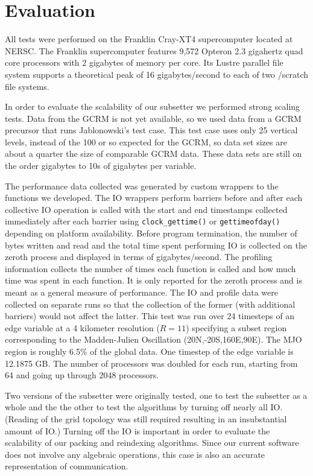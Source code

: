 \section{Evaluation}
\label{section:evaluation}

All tests were performed on the Franklin Cray-XT4 supercomputer\cite{franklin}
located at NERSC\cite{NERSC}.  The Franklin supercomputer features 9,572
Opteron 2.3 gigahertz quad core processors with 2 gigabytes of memory per
core.  Its Lustre parallel file system supports a theoretical peak of 16
gigabytes/second to each of two /scratch file systems.

In order to evaluate the scalability of our subsetter we performed strong
scaling tests. Data from the GCRM is not yet available, so we used data from a
GCRM precursor that runs Jablonowski's test case\cite{JAB}. This test case
uses only 25 vertical levels, instead of the 100 or so expected for the GCRM,
so data set sizes are about a quarter the size of comparable GCRM data. These
data sets are still on the order gigabytes to 10s of gigabytes per variable.

The performance data collected was generated by custom wrappers to the
functions we developed.  The IO wrappers perform barriers before and after
each collective IO operation is called with the start and end timestamps
collected immediately after each barrier using \verb=clock_gettime()= or
\verb=gettimeofday()= depending on platform availability.  Before program
termination, the number of bytes written and read and the total time spent
performing IO is collected on the zeroth process and displayed in terms of
gigabytes/second.  The profiling information collects the number of times each
function is called and how much time was spent in each function.  It is only
reported for the zeroth process and is meant as a general measure of
performance.  The IO and profile data were collected on separate runs so that
the collection of the former (with additional barriers) would not affect the
latter.  This test was run over 24 timesteps of an edge variable at a 4
kilometer resolution ($R=11$) specifying a subset region corresponding to the
Madden-Julien Oscillation\cite{MJO} (20N,-20S,160E,90E).  The MJO region is
roughly 6.5\% of the global data.  One timestep of the edge variable is
12.1875 GB.  The number of processors was doubled for each run, starting from
64 and going up through 2048 processors.

Two versions of the subsetter were originally tested, one to test the
subsetter as a whole and the the other to test the algorithms by turning off
nearly all IO.  (Reading of the grid topology was still required resulting in
an insubstantial amount of IO.)  Turning off the IO is important in order to
evaluate the scalability of our packing and reindexing algorithms.  Since our
current software does not involve any algebraic operations, this case is also
an accurate representation of communication.

